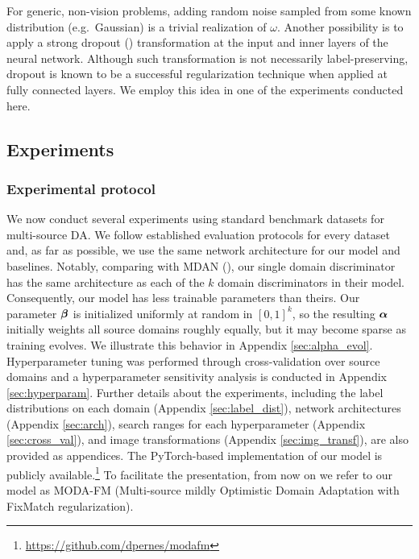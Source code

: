 For generic, non-vision problems, adding random noise sampled from some known distribution (e.g.\ Gaussian) is a trivial realization of $\omega$. Another possibility is to apply a strong dropout (\citet{Srivastava2014}) transformation at the input and inner layers of the neural network. Although such transformation is not necessarily label-preserving, dropout is known to be a successful regularization technique when applied at fully connected layers. We employ this idea in one of the experiments conducted here.

\subsection{Experiments}
\label{sec:modafm_experiments}

\subsubsection{Experimental protocol}
We now conduct several experiments using standard benchmark datasets for multi-source DA. We follow established evaluation protocols for every dataset and, as far as possible, we use the same network architecture for our model and baselines. Notably, comparing with MDAN (\citet{Zhao2018}), our single domain discriminator has the same architecture as each of the $k$ domain discriminators in their model. Consequently, our model has less trainable parameters than theirs. Our parameter ${\bm{\beta}}$ is initialized uniformly at random in $[0,1]^k$, so the resulting ${\bm{\alpha}}$ initially weights all source domains roughly equally, but it may become sparse as training evolves. We illustrate this behavior in Appendix \ref{sec:alpha_evol}. Hyperparameter tuning was performed through cross-validation over source domains and a hyperparameter sensitivity analysis is conducted in Appendix \ref{sec:hyperparam}. Further details about the experiments, including the label distributions on each domain (Appendix \ref{sec:label_dist}), network architectures (Appendix \ref{sec:arch}), search ranges for each hyperparameter (Appendix \ref{sec:cross_val}), and image transformations (Appendix \ref{sec:img_transf}), are also provided as appendices. The PyTorch-based implementation of our model is publicly available.\footnote{\url{https://github.com/dpernes/modafm}} To facilitate the presentation, from now on we refer to our model as MODA-FM (Multi-source mildly Optimistic Domain Adaptation with FixMatch regularization).

